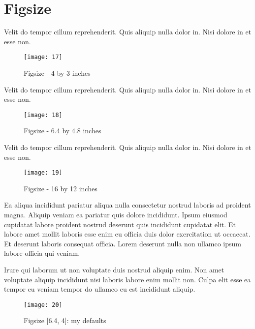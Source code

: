 \section{Figsize}
\label{sec:tight}
Velit do tempor cillum reprehenderit. Quis aliquip nulla dolor in. Nisi dolore in et esse non.

\begin{figure}[!h]
    \centering
    \texttt{[image: 17]}
    \caption{Figsize - 4 by 3 inches}
    \label{fig:small}
\end{figure}

Velit do tempor cillum reprehenderit. Quis aliquip nulla dolor in. Nisi dolore in et esse non.

\begin{figure}[!h]
    \centering
    \texttt{[image: 18]}
    \caption{Figsize - 6.4 by 4.8 inches}
    \label{fig:medium}
\end{figure}

Velit do tempor cillum reprehenderit. Quis aliquip nulla dolor in. Nisi dolore in et esse non.

\begin{figure}[!h]
    \centering
    \texttt{[image: 19]}
    \caption{Figsize - 16 by 12 inches}
    \label{fig:big}
\end{figure}

Ea aliqua incididunt pariatur aliqua nulla consectetur nostrud laboris ad proident magna. Aliquip veniam ea pariatur quis dolore incididunt. Ipsum eiusmod cupidatat labore proident nostrud deserunt quis incididunt cupidatat elit. Et labore amet mollit laboris esse enim eu officia duis dolor exercitation ut occaecat. Et deserunt laboris consequat officia. Lorem deserunt nulla non ullamco ipsum labore officia qui veniam.

Irure qui laborum ut non voluptate duis nostrud aliquip enim. Non amet voluptate aliquip incididunt nisi laboris labore enim mollit non. Culpa elit esse ea tempor eu veniam tempor do ullamco eu est incididunt aliquip.

\begin{figure}[!h]
    \centering
    \texttt{[image: 20]}
    \caption{Figsize [6.4, 4]: my defaults}
    \label{fig:usual_height}
\end{figure}
